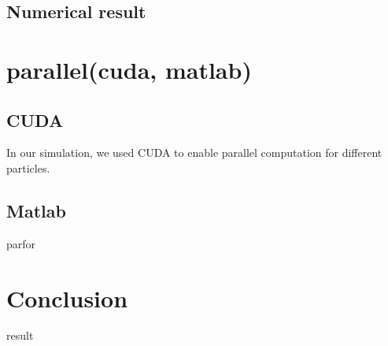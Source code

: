 \documentclass[%
 reprint,
 amsmath,amssymb,
 aps,
]{revtex4-1}
\begin{document}
\subsection{\label{sec:level1}Numerical result}



\section{\label{sec:level1}parallel(cuda, matlab)
}

\subsection{\label{sec:level1}CUDA}

In our simulation, we used CUDA to enable parallel computation for different particles. 

\subsection{\label{sec:level1}Matlab}

parfor


\section{\label{sec:level1}Conclusion}

result

% 
% 
\end{document}
